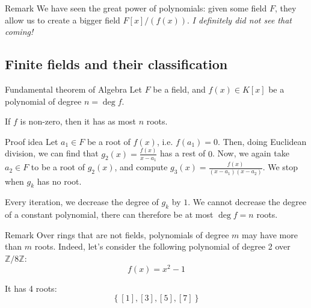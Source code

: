 \documentclass[a4paper]{article}
\begin{document}
\begin{parag}{Remark}
    We have seen the great power of polynomials: given some field $F$, they allow us to create a bigger field $F\left[x\right] / \left(f\left(x\right)\right)$. \textit{I definitely did not see that coming!}
\end{parag}

\subsection{Finite fields and their classification}

\begin{parag}{Fundamental theorem of Algebra}
    Let $F$ be a field, and $f\left(x\right) \in K\left[x\right]$ be a polynomial of degree $n = \deg f$.

    If $f$ is non-zero, then it has as most $n$ roots.

    \begin{subparag}{Proof idea}
         Let $a_1 \in F$ be a root of $f\left(x\right)$, i.e. $f\left(a_1\right) = 0$. Then, doing Euclidean division, we can find that $g_2\left(x\right) = \frac{f\left(x\right)}{x - a_1}$ has a rest of $0$. Now, we again take $a_2 \in F$ to be a root of $g_2\left(x\right)$, and compute $g_3\left(x\right) = \frac{f\left(x\right)}{\left(x - a_1\right)\left(x - a_2\right)}$. We stop when $g_k$ has no root.

        Every iteration, we decrease the degree of $g_k$ by $1$. We cannot decrease the degree of a constant polynomial, there can therefore be at most $\deg f = n$ roots.
    \end{subparag}

    \begin{subparag}{Remark}
        Over rings that are not fields, polynomials of degree $m$ may have more than $m$ roots. Indeed, let's consider the following polynomial of degree 2 over $\mathbb{Z}/8\mathbb{Z}$: 
        \[f\left(x\right) = x^2 - 1\]
        
        It has 4 roots: 
        \[\left\{\left[1\right], \left[3\right], \left[5\right], \left[7\right]\right\}\]
    \end{subparag}
\end{parag}
\end{document}
